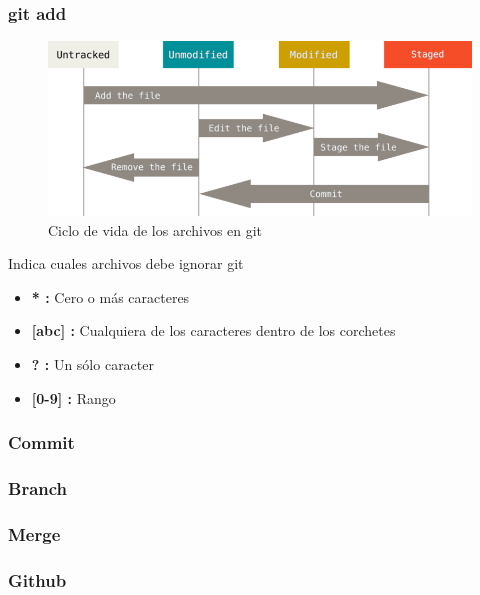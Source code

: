 \documentclass{beamer}
\begin{document}
\begin{frame}
  \frametitle{git add}
  \begin{figure}
    \centering
    \includegraphics[width=\textwidth]{ciclo}
    \caption{Ciclo de vida de los archivos en git}
  \end{figure}
\end{frame}

\begin{frame}
  \begin{center}
    \resizebox{\textwidth}{!}{\FiraTitle \color{green}{.gitignore}}
    \vspace{1em}
    
    {\FiraTitle Indica cuales archivos debe ignorar git}
    \vspace{1em}
  \end{center}
  {\FiraTitle \color{purple}{Glob patterns:}}
  \begin{itemize}
  \item \textbf{* :} Cero o más caracteres
  \item \textbf{[abc] :} Cualquiera de los caracteres dentro de los corchetes
  \item \textbf{? :} Un sólo caracter
  \item \textbf{[0-9] :} Rango
  \end{itemize}
\end{frame}

\begin{frame}
\frametitle{Commit}
\end{frame}

\begin{frame}
\frametitle{Branch}
\end{frame}

\begin{frame}
\frametitle{Merge}
\end{frame}

\begin{frame}
\frametitle{Github}
\end{frame}
\end{document}

